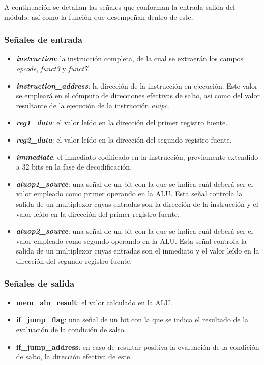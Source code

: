 A continuación se detallan las señales que conforman la entrada-salida del módulo, así como la función que desempeñan dentro de este.

\subsubsection{Señales de entrada}

\begin{itemize}
  \item \textbf{\textit{instruction}}: la instrucción completa, de la cual se extraerán los campos \textit{opcode}, \textit{funct3} y \textit{funct7}.
  \item \textbf{\textit{instruction\_address}}: la dirección de la instrucción en ejecución. Este valor se empleará en el cómputo de direcciones efectivas de salto, así como del valor resultante de la ejecución de la instrucción \textit{auipc}.
  \item \textbf{\textit{reg1\_data}}: el valor leído en la dirección del primer registro fuente.
  \item \textbf{\textit{reg2\_data}}: el valor leído en la dirección del segundo registro fuente.
  \item \textbf{\textit{immediate}}: el inmediato codificado en la instrucción, previamente extendido a 32 bits en la fase de decodificación.
  \item \textbf{\textit{aluop1\_source}}: una señal de un bit con la que se indica cuál deberá ser el valor empleado como primer operando en la ALU. Esta señal controla la salida de un multiplexor cuyas entradas son la dirección de la instrucción y el valor leído en la dirección del primer registro fuente.
  \item \textbf{\textit{aluop2\_source}}: una señal de un bit con la que se indica cuál deberá ser el valor empleado como segundo operando en la ALU. Esta señal controla la salida de un multiplexor cuyas entradas son el inmediato y el valor leído en la dirección del segundo registro fuente.
\end{itemize}

\subsubsection{Señales de salida}

\begin{itemize}
  \item \textbf{mem\_alu\_result}: el valor calculado en la ALU.
  \item \textbf{if\_jump\_flag}: una señal de un bit con la que se indica el resultado de la evaluación de la condición de salto.
  \item \textbf{if\_jump\_address}: en caso de resultar positiva la evaluación de la condición de salto, la dirección efectiva de este.
\end{itemize}

